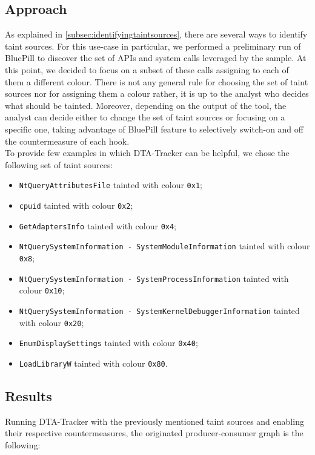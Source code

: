 \documentclass[LaM,binding=0.6cm]{sapthesis}
\begin{document}
\subsection{Approach}
As explained in \autoref{subsec:identifyingtaintsources}, there are several ways to identify taint sources. For this use-case in particular, we performed a preliminary run of BluePill to discover the set of APIs and system calls leveraged by the sample. At this point, we decided to focus on a subset of these calls assigning to each of them a different colour. There is not any general rule for choosing the set of taint sources nor for assigning them a colour rather, it is up to the analyst who decides what should be tainted. Moreover, depending on the output of the tool, the analyst can decide either to change the set of taint sources or focusing on a specific one, taking advantage of BluePill feature to selectively switch-on and off the countermeasure of each hook.\\
To provide few examples in which DTA-Tracker can be helpful, we chose the following set of taint sources:
\begin{itemize}
\item \texttt{NtQueryAttributesFile} tainted with colour \texttt{0x1};
\item \texttt{cpuid} tainted with colour \texttt{0x2};
\item \texttt{GetAdaptersInfo} tainted with colour \texttt{0x4};
\item \texttt{NtQuerySystemInformation - SystemModuleInformation} tainted with colour \texttt{0x8};
\item \texttt{NtQuerySystemInformation - SystemProcessInformation} tainted with colour \texttt{0x10};
\item \texttt{NtQuerySystemInformation - SystemKernelDebuggerInformation} tainted with colour \texttt{0x20};
\item \texttt{EnumDisplaySettings} tainted with colour \texttt{0x40};
\item \texttt{LoadLibraryW} tainted with colour \texttt{0x80}.
\end{itemize}
\newpage
\subsection{Results}
Running DTA-Tracker with the previously mentioned taint sources and enabling their respective countermeasures, the originated producer-consumer graph is the following:\\
\end{document}
